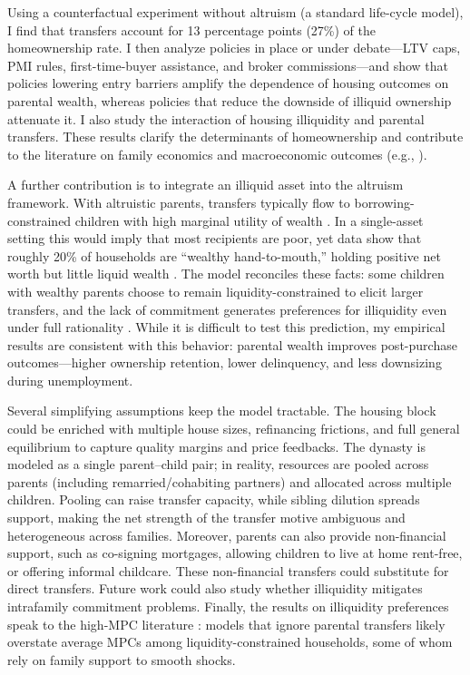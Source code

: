 \documentclass[12pt]{article}
\begin{document}
Using a counterfactual experiment without altruism (a standard life-cycle model), I find that transfers account for 13 percentage points (27\%) of the homeownership rate. I then analyze policies in place or under debate---LTV caps, PMI rules, first-time-buyer assistance, and broker commissions---and show that policies lowering entry barriers amplify the dependence of housing outcomes on parental wealth, whereas policies that reduce the downside of illiquid ownership attenuate it. I also study the interaction of housing illiquidity and parental transfers. These results clarify the determinants of homeownership and contribute to the literature on family economics and macroeconomic outcomes (e.g., \cite{Doepke2016a,Daruich2018}).

A further contribution is to integrate an illiquid asset into the altruism framework. With altruistic parents, transfers typically flow to borrowing-constrained children with high marginal utility of wealth \citep{Barczyk2020,Chu2020}. In a single-asset setting this would imply that most recipients are poor, yet data show that roughly 20\% of households are “wealthy hand-to-mouth,” holding positive net worth but little liquid wealth \citep{Kaplan2014a,Attanasio2018}. The model reconciles these facts: some children with wealthy parents choose to remain liquidity-constrained to elicit larger transfers, and the lack of commitment generates preferences for illiquidity even under full rationality \citep[cf.][]{attanasio2024temptation}.  While it is difficult to test this prediction, my empirical results are consistent with this behavior: parental wealth improves post-purchase outcomes---higher ownership retention, lower delinquency, and less downsizing during unemployment.

Several simplifying assumptions keep the model tractable. The housing block could be enriched with multiple house sizes, refinancing frictions, and full general equilibrium to capture quality margins and price feedbacks. The dynasty is modeled as a single parent–child pair; in reality, resources are pooled across parents (including remarried/cohabiting partners) and allocated across multiple children. Pooling can raise transfer capacity, while sibling dilution spreads support, making the net strength of the transfer motive ambiguous and heterogeneous across families.  Moreover, parents can also provide non-financial support, such as co-signing mortgages, allowing children to live at home rent-free, or offering informal childcare. These non-financial transfers could substitute for direct transfers. Future work could also study whether illiquidity mitigates intrafamily commitment problems. Finally, the results on illiquidity preferences speak to the high-MPC literature \citep[e.g.,][]{kaplan2022marginal}: models that ignore parental transfers likely overstate average MPCs among liquidity-constrained households, some of whom rely on family support to smooth shocks.
\end{document}

